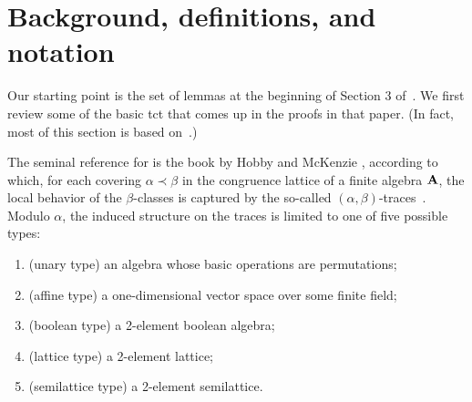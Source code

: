 \documentclass{ws-ijac}
\begin{document}

%



\section{Background, definitions, and notation}
\label{sec:defin-notat}
Our starting point is the set of lemmas at the beginning of Section 3 of~\cite{Freese:2009}.
We first review some of the basic \ac{tct}
that comes up in the proofs in that paper. (In fact, most of this section
is based on~\cite[Section~2]{Freese:2009}.)

The seminal reference for \tct is the book by Hobby and McKenzie
\cite{HM:1988}, according to which,
for each covering $\alpha \prec \beta$ in the congruence lattice of a finite
algebra $\mathbf{A}$, the local behavior of the $\beta$-classes is captured by the
so-called $(\alpha, \beta)$-traces~\cite[Def.~2.15]{HM:1988}.
Modulo $\alpha$, the induced structure on the traces is limited to one
of five possible types:

\begin{enumerate}[{\bf 1}]
\item  (unary type) an algebra whose basic operations are permutations;
\item  (affine type) a one-dimensional vector space over some finite field;
\item  (boolean type) a 2-element boolean algebra;
\item  (lattice type) a 2-element lattice;
\item  (semilattice type) a 2-element semilattice.
\end{enumerate}
\end{document}
